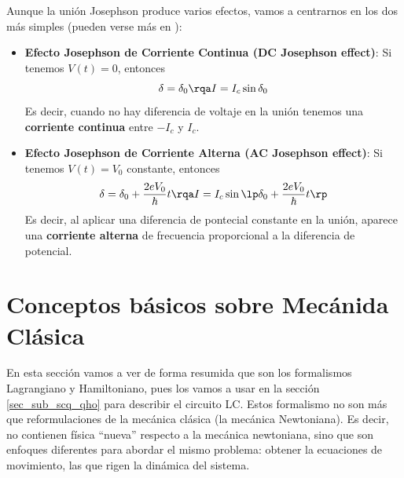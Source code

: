         Aunque la unión Josephson produce varios efectos, vamos a centrarnos en los dos más simples (pueden verse más en \cite{bib_scq_Waldram}):
        \begin{itemize}
            \item \textbf{Efecto Josephson de Corriente Continua (DC Josephson effect)}: Si tenemos $V(t)=0$, entonces 
            \begin{equation}
            \delta = \delta_0 \rqa I = I_c \sin \delta_0
            \end{equation}
            Es decir, cuando no hay diferencia de voltaje en la unión tenemos una \textbf{corriente continua} entre $-I_c$ y $I_c$.
            
            \item \textbf{Efecto Josephson de Corriente Alterna (AC Josephson effect)}: Si tenemos $V(t) = V_0$ constante, entonces
            \begin{equation}
            \delta = \delta_0 + \frac{2eV_0}{\hbar} t \rqa I = I_c \sin \lp \delta_0 + \frac{2eV_0}{\hbar} t  \rp
            \end{equation}
            Es decir, al aplicar una diferencia de pontecial constante en la unión, aparece una \textbf{corriente alterna} de frecuencia proporcional a la diferencia de potencial.
        	
        \end{itemize}






\newpage

\section{Conceptos básicos sobre Mecánida Clásica} \label{sec_scq_conceptos_mecanica}

    
En esta sección vamos a ver de forma resumida que son los formalismos Lagrangiano y Hamiltoniano, pues los vamos a usar en la sección \ref{sec_sub_scq_qho} para describir el circuito LC. Estos formalismo no son más que reformulaciones de la mecánica clásica (la mecánica Newtoniana). Es decir, no contienen física ``nueva'' respecto a la mecánica newtoniana, sino que son enfoques diferentes para abordar el mismo problema: obtener la ecuaciones de movimiento, las que rigen la dinámica del sistema.

